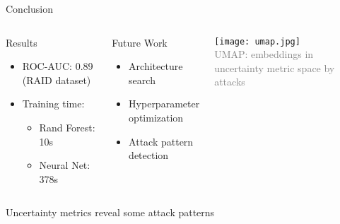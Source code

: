 \documentclass{beamer}
\begin{document}
\begin{frame}{Conclusion}
\begin{columns}[T]
\begin{block}{Results}
\begin{itemize}
\item ROC-AUC: 0.89 (RAID dataset)
\item Training time:
  \begin{itemize}
  \item Rand Forest: 10s
  \item Neural Net: 378s
  \end{itemize}
\end{itemize}
\end{block}

\begin{block}{Future Work}
\begin{itemize}
\item Architecture search
\item Hyperparameter optimization
\item Attack pattern detection
\end{itemize}
\end{block}

\begin{center}
\texttt{[image: umap.jpg]}\\
\footnotesize\textcolor{gray}{UMAP: embeddings in uncertainty metric space by attacks}
\end{center}
\end{columns}

\begin{alertblock}{}
\centering Uncertainty metrics reveal some attack patterns
\end{alertblock}
\end{frame}
\end{document}

